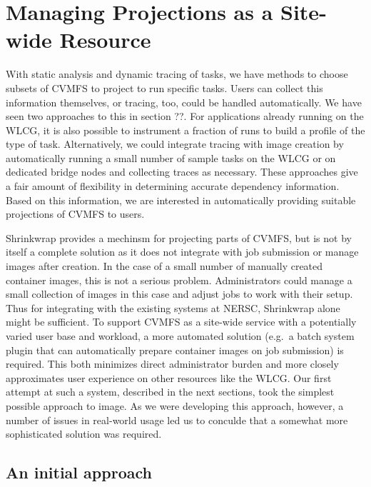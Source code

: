 \documentclass[sigconf]{acmart}
\begin{document}
\section{Managing Projections as a Site-wide Resource}

With static analysis and dynamic tracing of tasks,
we have methods to choose subsets of CVMFS to project to run specific tasks.
Users can collect this information themselves,
or tracing, too, could be handled automatically.
We have seen two approaches to this in section ??.
For applications already running on the WLCG,
it is also possible to instrument a fraction of runs to build a profile of the type of task.
Alternatively, we could integrate tracing with image creation by automatically running a small number of sample tasks on the WLCG or on dedicated bridge nodes and collecting traces as necessary.
These approaches give a fair amount of flexibility in determining accurate dependency information.
Based on this information,
we are interested in automatically providing suitable projections of CVMFS to users.

Shrinkwrap provides a mechinsm for projecting parts of CVMFS,
but is not by itself a complete solution as it does not integrate with job submission or manage images after creation.
In the case of a small number of manually created container images,
this is not a serious problem.
Administrators could manage a small collection of images in this case and adjust jobs to work with their setup.
Thus for integrating with the existing systems at NERSC,
Shrinkwrap alone might be sufficient.
To support CVMFS as a site-wide service with a potentially varied user base and workload,
a more automated solution
(e.g.\ a batch system plugin that can automatically prepare container images on job submission)
is required.
This both minimizes direct administrator burden and more closely approximates user experience on other resources like the WLCG.
Our first attempt at such a system,
described in the next sections,
took the simplest possible approach to image.
As we were developing this approach, however,
a number of issues in real-world usage led us to conculde that a somewhat more sophisticated solution was required.

\subsection{An initial approach}
\end{document}
